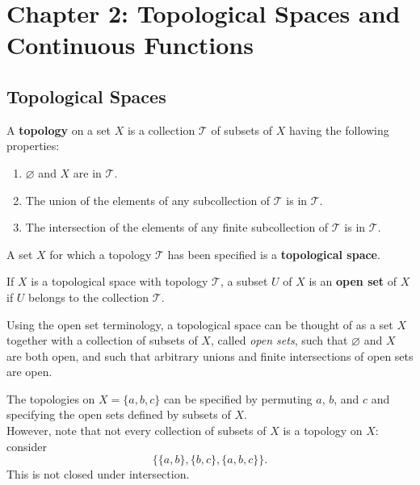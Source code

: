 \newpage

\section{Chapter 2: Topological Spaces and Continuous Functions}
\setcounter{subsection}{11}

\subsection{Topological Spaces}
\begin{definition}[Topology]
A \textbf{topology} on a set $X$ is a collection $\mathscr{T}$ of subsets of $X$ having the following properties:
\begin{enumerate}
    \item $\varnothing$ and $X$ are in $\mathscr{T}$.
    \item The union of the elements of any subcollection of $\mathscr{T}$ is in $\mathscr{T}$.
    \item The intersection of the elements of any finite subcollection of $\mathscr{T}$ is in $\mathscr{T}$.
\end{enumerate}
A set $X$ for which a topology $\mathscr{T}$ has been specified is a \textbf{topological space}.
\end{definition}

\begin{definition}
If $X$ is a topological space with topology $\mathscr{T}$, a subset $U$ of $X$ is an \textbf{open set} of $X$
if $U$ belongs to the collection $\mathscr{T}$.  
\end{definition}

\begin{remark}
Using the open set terminology, a topological space can be thought of as a set $X$ together with a collection
of subsets of $X$, called \textit{open sets}, such that $\varnothing$ and $X$ are both open, and such that arbitrary unions
and finite intersections of open sets are open.
\end{remark}

\begin{eg}
The topologies on $X = \{ a, b, c \}$ can be specified by permuting $a$, $b$, and $c$ and specifying the open sets defined by subsets of $X$. \\

However, note that not every collection of subsets of $X$ is a topology on $X$: consider 
\[
    \{\{ a, b \}, \{ b, c \}, \{  a, b, c \}\}.
\]
This is not closed under intersection.
\end{eg}

